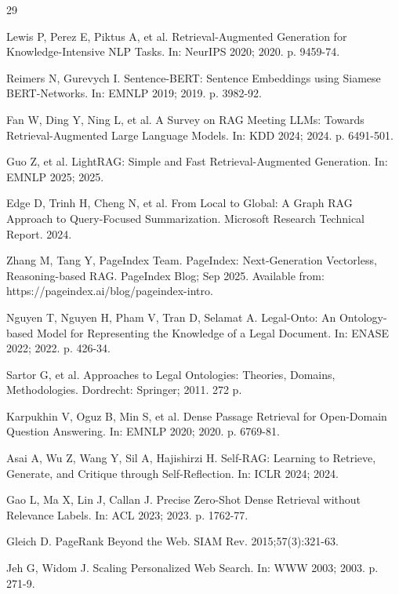 \begin{thebibliography}{29}
\setlength{\itemsep}{0pt}\setlength{\parsep}{0pt}\setlength{\parskip}{0pt}

Lewis P, Perez E, Piktus A, et al. Retrieval-Augmented Generation for Knowledge-Intensive NLP Tasks. In: NeurIPS 2020; 2020. p. 9459-74.

Reimers N, Gurevych I. Sentence-BERT: Sentence Embeddings using Siamese BERT-Networks. In: EMNLP 2019; 2019. p. 3982-92.

Fan W, Ding Y, Ning L, et al. A Survey on RAG Meeting LLMs: Towards Retrieval-Augmented Large Language Models. In: KDD 2024; 2024. p. 6491-501.

Guo Z, et al. LightRAG: Simple and Fast Retrieval-Augmented Generation. In: EMNLP 2025; 2025.

Edge D, Trinh H, Cheng N, et al. From Local to Global: A Graph RAG Approach to Query-Focused Summarization. Microsoft Research Technical Report. 2024.

Zhang M, Tang Y, PageIndex Team. PageIndex: Next-Generation Vectorless, Reasoning-based RAG. PageIndex Blog; Sep 2025. Available from: https://pageindex.ai/blog/pageindex-intro.

Nguyen T, Nguyen H, Pham V, Tran D, Selamat A. Legal-Onto: An Ontology-based Model for Representing the Knowledge of a Legal Document. In: ENASE 2022; 2022. p. 426-34.

Sartor G, et al. Approaches to Legal Ontologies: Theories, Domains, Methodologies. Dordrecht: Springer; 2011. 272 p.

Karpukhin V, Oguz B, Min S, et al. Dense Passage Retrieval for Open-Domain Question Answering. In: EMNLP 2020; 2020. p. 6769-81.

Asai A, Wu Z, Wang Y, Sil A, Hajishirzi H. Self-RAG: Learning to Retrieve, Generate, and Critique through Self-Reflection. In: ICLR 2024; 2024.

Gao L, Ma X, Lin J, Callan J. Precise Zero-Shot Dense Retrieval without Relevance Labels. In: ACL 2023; 2023. p. 1762-77.

Gleich D. PageRank Beyond the Web. SIAM Rev. 2015;57(3):321-63.

Jeh G, Widom J. Scaling Personalized Web Search. In: WWW 2003; 2003. p. 271-9.


\end{thebibliography}
